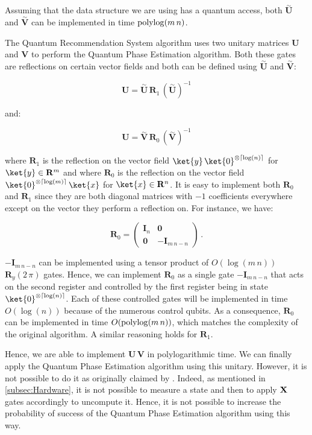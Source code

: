 \documentclass[11pt, a4paper]{article}
\begin{document}
            Assuming that the data structure we are using has a quantum access, both \(\overset{\sim}{\mathbf{U}}\) and \(\overset{\sim}{\mathbf{V}}\) can be implemented in time \(\operatorname{polylog}(m\,n)\).
            
            The Quantum Recommendation System algorithm uses two unitary matrices \(\mathbf{U}\) and \(\mathbf{V}\) to perform the Quantum Phase Estimation algorithm. Both these gates are reflections on certain vector fields and both can be defined using \(\overset{\sim}{\mathbf{U}}\) and \(\overset{\sim}{\mathbf{V}}\):
            
            \[\mathbf{U}=\overset{\sim}{\mathbf{U}}\,\mathbf{R}_1\,\left(\overset{\sim}{\mathbf{U}}\right)^{-1}\]
            
            and:
            
            \[\mathbf{U}=\overset{\sim}{\mathbf{V}}\,\mathbf{R}_0\,\left(\overset{\sim}{\mathbf{V}}\right)^{-1}\]
            
            where \(\mathbf{R}_1\) is the reflection on the vector field \(\ket{y}\,\ket{0}^{\otimes\lceil\log(n)\rceil}\) for \(\ket{y}\in\mathbf{R}^m\) and where \(\mathbf{R}_0\) is the reflection on the vector field \(\ket{0}^{\otimes\lceil\log(m)\rceil}\,\ket{x}\) for \(\ket{x}\in\mathbf{R}^n\). It is easy to implement both \(\mathbf{R}_0\) and \(\mathbf{R}_1\) since they are both diagonal matrices with \(-1\) coefficients everywhere except on the vector they perform a reflection on. For instance, we have:
            
            \[\mathbf{R}_0=\begin{pmatrix}\mathbf{I}_{n} & \mathbf{0}\\\mathbf{0} & -\mathbf{I}_{m\,n - n}\end{pmatrix}\,.\]
            
            \(-\mathbf{I}_{m\,n-n}\) can be implemented using a tensor product of \(O(\log(m\,n))\) \(\mathbf{R}_y(2\,\pi)\) gates. Hence, we can implement \(\mathbf{R}_0\) as a single gate \(-\mathbf{I}_{m\,n-n}\) that acts on the second register and controlled by the first register being in state \(\ket{0}^{\otimes\lceil\log(n)\rceil}\). Each of these controlled gates will be implemented in time \(O(\log(n))\) because of the numerous control qubits. As a consequence, \(\mathbf{R}_0\) can be implemented in time \(O(\operatorname{polylog}(m\,n))\), which matches the complexity of the original algorithm. A similar reasoning holds for \(\mathbf{R}_1\).
            
            Hence, we are able to implement \(\mathbf{U}\,\mathbf{V}\) in polylogarithmic time. We can finally apply the Quantum Phase Estimation algorithm using this unitary. However, it is not possible to do it as originally claimed by \citeauthor{QRS}. Indeed, as mentioned in \autoref{subsec:Hardware}, it is not possible to measure a state and then to apply \(\mathbf{X}\) gates accordingly to uncompute it. Hence, it is not possible to increase the probability of success of the Quantum Phase Estimation algorithm using this way.
            
\end{document}
